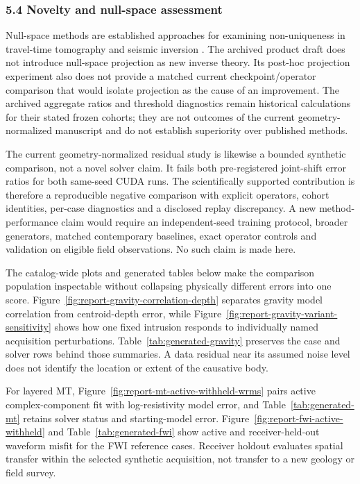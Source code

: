 \subsubsection{5.4 Novelty and null-space
assessment}\label{nullspace-novelty-assessment}

Null-space methods are established approaches for examining
non-uniqueness in travel-time tomography and seismic inversion
\cite{deWit2012,Liu2020,TorresSacchi2023}. The archived product draft
does not introduce null-space projection as new inverse theory. Its
post-hoc projection experiment also does not provide a matched current
checkpoint/operator comparison that would isolate projection as the
cause of an improvement. The archived aggregate ratios and threshold
diagnostics remain historical calculations for their stated frozen
cohorts; they are not outcomes of the current geometry-normalized manuscript and do not
establish superiority over published methods.

The current geometry-normalized residual study is likewise a bounded
synthetic comparison, not a novel solver claim. It fails both
pre-registered joint-shift error ratios for both same-seed CUDA runs.
The scientifically supported contribution is therefore a reproducible
negative comparison with explicit operators, cohort identities,
per-case diagnostics and a disclosed replay discrepancy. A new
method-performance claim would require an independent-seed training
protocol, broader generators, matched contemporary baselines, exact
operator controls and validation on eligible field observations. No
such claim is made here.

The catalog-wide plots and generated tables below make the comparison
population inspectable without collapsing physically different errors
into one score. Figure~\ref{fig:report-gravity-correlation-depth}
separates gravity model correlation from centroid-depth error, while
Figure~\ref{fig:report-gravity-variant-sensitivity} shows how one fixed
intrusion responds to individually named acquisition perturbations.
Table~\ref{tab:generated-gravity} preserves the case and solver rows
behind those summaries. A data residual near its assumed noise level
does not identify the location or extent of the causative body.

For layered MT, Figure~\ref{fig:report-mt-active-withheld-wrms} pairs
active complex-component fit with log-resistivity model error, and
Table~\ref{tab:generated-mt} retains solver status and starting-model
error. Figure~\ref{fig:report-fwi-active-withheld} and
Table~\ref{tab:generated-fwi} show active and receiver-held-out waveform
misfit for the FWI reference cases. Receiver holdout evaluates spatial
transfer within the selected synthetic acquisition, not transfer to a
new geology or field survey.


